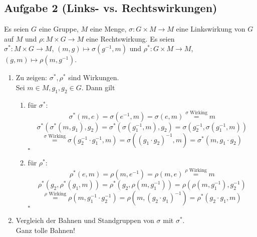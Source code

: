 \documentclass[11pt,a4paper,ngerman]{article}
\begin{document}

\subsection*{Aufgabe 2 \mdseries (Links- vs. Rechtswirkungen)}
Es seien $G$ eine Gruppe, $M$ eine Menge,
$\sigma : G \times M \to M$ eine Linkswirkung von $G$ auf $M$ und
$\rho : M \times G \to M$ eine Rechtswirkung. Es seien \\
 $\sigma^{*}: M \times G \to M$, $(m,g) \mapsto \sigma(g^{-1},m)$ und 
$\rho^{*}: G \times M \to M$, $(g,m) \mapsto \rho(m, g^{-1})$.

\begin{enumerate}[\bfseries i)]
\item Zu zeigen: $\sigma^{*}, \rho^{*}$ sind Wirkungen. \\
Sei $m \in M, g_1, g_2 \in G$. Dann gilt
\begin{enumerate}[\bfseries (1)]
\item für $\sigma^{*}$: \\
$$ \sigma^{*}(m,e) = \sigma(e^{-1},m) = \sigma(e,m) \stackrel{\sigma \text{ Wirking}}{=} m $$
$$ \sigma^{*}(\sigma^{*}(m,g_1),g_2) = \sigma^{*}(\sigma(g_1^{-1},m),g_2) = \sigma(g_2^{-1},\sigma(g_1^{-1},m)) $$
$$
\stackrel{\sigma \text{ Wirking}}{=} \sigma(g_2^{-1}\cdot g_1^{-1},m) 
= \sigma((g_1 \cdot g_2)^{-1},m) = \sigma^{*}(m,g_1 \cdot g_2)
$$
\mbox{} \hfill $\square$
\item für $\rho^{*}$: \\
$$ \rho^{*}(e,m) = \rho(m,e^{-1}) = \rho(m,e) \stackrel{\rho \text{ Wirking}}{=} m $$
$$ \rho^{*}(g_2,\rho^{*}(g_1,m)) = \rho^{*}(g_2,\rho(m,g_1^{-1})) = \rho(\rho(m,g_1^{-1}),g_2^{-1}) $$
$$
\stackrel{\rho \text{ Wirking}}{=} \rho(m,g_1^{-1}\cdot g_2^{-1}) 
= \rho(m,(g_2 \cdot g_1)^{-1}) = \rho^{*}(g_2 \cdot g_1,m)
$$
\mbox{} \hfill $\square$

\end{enumerate}

\item Vergleich der Bahnen und Standgruppen von $\sigma$ mit $\sigma^{*}$. \\

Ganz tolle Bahnen!

\end{enumerate}



\end{document}
